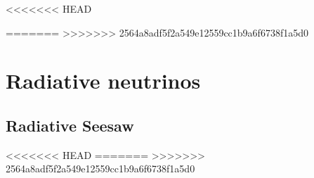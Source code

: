 <<<<<<< HEAD

=======
>>>>>>> 2564a8adf5f2a549e12559cc1b9a6f6738f1a5d0
\chapter{Radiative neutrinos}

\section{Radiative Seesaw}








<<<<<<< HEAD
=======
>>>>>>> 2564a8adf5f2a549e12559cc1b9a6f6738f1a5d0
